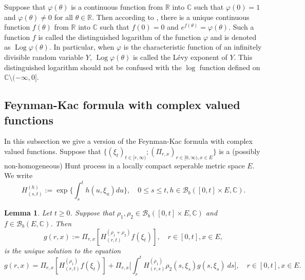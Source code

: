 \documentclass[12pt,a4paper]{amsart}
\theoremstyle{plain}
\newtheorem{lem}[thm]{Lemma}
\theoremstyle{definition}
\numberwithin{equation}{section}
\begin{document}
	Suppose that $\varphi(\theta)$ is a continuous function from $\mathbb R$ into $\mathbb C$ such that $\varphi(0) = 1$ and $\varphi(\theta) \neq 0$ for all $\theta \in \mathbb R$.
	Then according to \cite[Lemma 7.6]{Sato2013Levy}, there is a unique continuous function $f(\theta)$ from $\mathbb R$ into $\mathbb C$ such that $f(0) = 0$ and $e^{f(\theta)} = \varphi(\theta)$.
	Such a function $f$ is called the distinguished logarithm of the function $\varphi$ and is denoted as $\operatorname{Log} \varphi(\theta)$.
	In particular, when $\varphi$ is the characteristic function of an infinitely divisible random variable $Y$,  $\operatorname{Log} \varphi(\theta)$ is called the L\'evy exponent of $Y$.
 	This distinguished logarithm should not be confused with the $\log$ function defined on $\mathbb C\setminus (-\infty, 0]$.

\subsection{Feynman-Kac formula with complex valued functions}
\label{seq: complex Feynman-Kac transform}
    In this subsection we give a version of the Feynman-Kac formula with complex valued functions.
    Suppose that $\{(\xi_t)_{t \in [r,\infty)}; (\Pi_{r,x})_{r\in [0,\infty), x\in E}\}$ is a (possibly non-homogeneous) Hunt process in a locally compact seperable metric space $E$.
    We write
\begin{equation}
    H^{(h)}_{(s,t)}
    := \exp\Big\{\int_s^t h(u,\xi_u) du\Big\},
    \quad 0 \leq s \leq t, h \in \mathcal B_b([0,t] \times E,\mathbb C).
\end{equation}

\begin{lem}
    Let $t \geq 0$. Suppose that 
    $\rho_1, \rho_2\in \mathcal B_b([0,t] \times E, \mathbb C)$ 
    and $f\in \mathcal B_b(E, \mathbb C)$.
    Then
\begin{equation}
    g(r,x) := \Pi_{r,x}[ H_{(r,t)}^{(\rho_1+\rho_2)} f(\xi_t)],\quad r \in [0,t], x\in E,
\end{equation}
    is the unique solution to the equation
\[
    g(r,x)= \Pi_{r,x} [ H_{(r,t)}^{(\rho_1)} f(\xi_t)]+\Pi_{r,x} \Big[ \int_r^tH_{(r,s)}^{(\rho_1)}\rho_2(s,\xi_s) g(s,\xi_s)~ds \Big],\quad r \in [0,t], x\in E.
\]
\end{lem}
\end{document}

